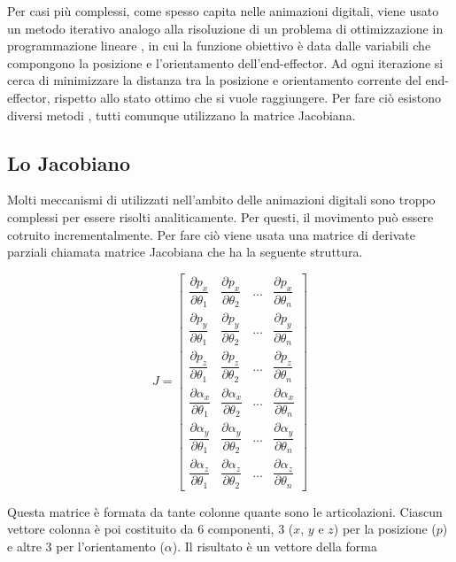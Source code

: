 Per casi più complessi, come spesso capita nelle animazioni digitali, viene usato un metodo iterativo  analogo alla risoluzione di un problema di ottimizzazione in programmazione lineare \cite{lp2017}, in cui la funzione obiettivo è data dalle variabili che compongono la posizione e l'orientamento dell'end-effector.
Ad ogni iterazione si cerca di minimizzare la distanza tra la posizione e orientamento corrente del end-effector, rispetto allo stato ottimo che si vuole raggiungere.
Per fare ciò esistono diversi metodi \cite{simplex2011, simplex2006} \cite{mingozR2019} \cite{mingozD2019}, tutti comunque utilizzano la matrice Jacobiana.

\subsection{Lo Jacobiano}

Molti meccanismi di utilizzati nell'ambito delle animazioni digitali sono troppo complessi per essere risolti analiticamente. Per questi, il movimento può essere cotruito incrementalmente.
Per fare ciò viene usata una matrice di derivate parziali chiamata matrice Jacobiana \cite{Parent:2012:CAA:2385444} che ha la seguente struttura.

\[J=
\begin{bmatrix}
    \dfrac{\partial p_x}{\partial \theta_1} & \dfrac{\partial p_x}{\partial \theta_2} & \dots & \dfrac{\partial p_x}{\partial \theta_n} \\[2ex]
    \dfrac{\partial p_y}{\partial \theta_1} & \dfrac{\partial p_y}{\partial \theta_2} & \dots & \dfrac{\partial p_y}{\partial \theta_n} \\[2ex]
    \dfrac{\partial p_z}{\partial \theta_1} & \dfrac{\partial p_z}{\partial \theta_2} & \dots & \dfrac{\partial p_z}{\partial \theta_n} \\[2ex]
    \dfrac{\partial \alpha_x}{\partial \theta_1} & \dfrac{\partial \alpha_x}{\partial \theta_2} & \dots & \dfrac{\partial \alpha_x}{\partial \theta_n} \\[2ex]
    \dfrac{\partial \alpha_y}{\partial \theta_1} & \dfrac{\partial \alpha_y}{\partial \theta_2} & \dots & \dfrac{\partial \alpha_y}{\partial \theta_n} \\[2ex]
    \dfrac{\partial \alpha_z}{\partial \theta_1} & \dfrac{\partial \alpha_z}{\partial \theta_2} & \dots & \dfrac{\partial \alpha_z}{\partial \theta_n} 
\end{bmatrix}
\]

Questa matrice è formata da tante colonne quante sono le articolazioni. Ciascun vettore colonna è poi costituito da 6 componenti, 3 ($x$, $y$ e $z$) per la posizione ($p$) e altre 3 per l'orientamento ($\alpha$).
Il risultato è un vettore della forma

